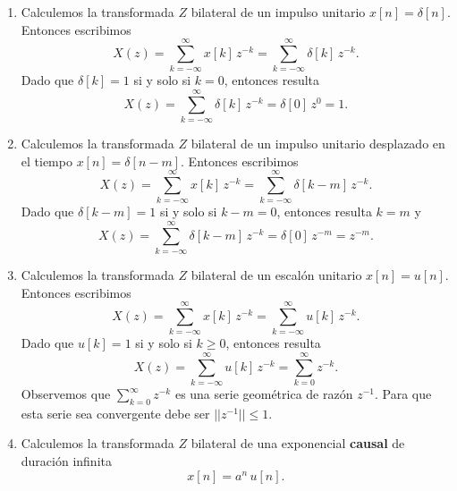 \begin{enumerate}

\item Calculemos la transformada $Z$ bilateral de un impulso unitario $x[n] = \delta[n]$.
Entonces escribimos
\begin{equation}
X(z) = \sum_{k=-\infty}^{\infty} x[k] \, z^{-k} = \sum_{k=-\infty}^{\infty} \delta[k] \, z^{-k}. 
\end{equation}
Dado que $\delta[k] = 1$ si y solo si $k=0$, entonces resulta
\begin{equation}
X(z) = \sum_{k=-\infty}^{\infty} \delta[k] \, z^{-k} = \delta[0] \, z^{0} = 1. 
\end{equation}

\item Calculemos la transformada $Z$ bilateral de un impulso unitario desplazado en el tiempo $x[n] = \delta[n-m]$.
Entonces escribimos
\begin{equation}
X(z) = \sum_{k=-\infty}^{\infty} x[k] \, z^{-k} = \sum_{k=-\infty}^{\infty} \delta[k-m] \, z^{-k}. 
\end{equation}
Dado que $\delta[k-m] = 1$ si y solo si $k-m=0$, entonces resulta $k = m$ y
\begin{equation}
X(z) = \sum_{k=-\infty}^{\infty} \delta[k-m] \, z^{-k} = \delta[0] \, z^{-m} = z^{-m}. 
\end{equation}

\item Calculemos la transformada $Z$ bilateral de un escal\'{o}n unitario $x[n] = u[n]$.
Entonces escribimos
\begin{equation}
X(z) = \sum_{k=-\infty}^{\infty} x[k] \, z^{-k} = \sum_{k=-\infty}^{\infty} u[k] \, z^{-k}. 
\end{equation}
Dado que $u[k] = 1$ si y solo si $k \geq 0$, entonces resulta
\begin{equation}
X(z) = \sum_{k=-\infty}^{\infty} u[k] \, z^{-k} = \sum_{k=0}^{\infty} z^{-k}. 
\end{equation}
Observemos que $\sum_{k=0}^{\infty} z^{-k}$ es una serie geom\'{e}trica de raz\'{o}n $z^{-1}$. Para que esta serie sea convergente debe ser $|| z^{-1} || \leq 1$.

\item Calculemos la transformada $Z$ bilateral de una exponencial \textbf{causal} de duraci\'{o}n infinita
\begin{equation}
x\left[ n\right] =a^{n} \, u\left[ n\right] .
\end{equation}


\end{enumerate}

